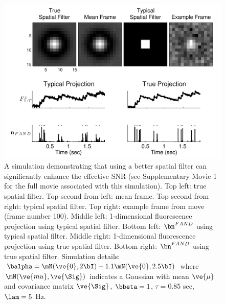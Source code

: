 \begin{figure}[H]
\centering \includegraphics[width=.9\linewidth]{../figs/spatial}
\caption{A simulation demonstrating that using a better spatial filter can significantly enhance the effective SNR (see Supplementary Movie 1 for the full movie associated with this simulation).  Top left: true spatial filter.  Top second from left: mean frame.  Top second from right: typical spatial filter.   Top right: example frame from move (frame number 100).  Middle left: 1-dimensional fluorescence projection using typical spatial filter.  Bottom left: $\bn^{FAND}$ using typical spatial filter.  Middle right: 1-dimensional fluorescence projection using true spatial filter.  Bottom right: $\bn^{FAND}$ using true spatial filter. Simulation details: $\balpha=\mN(\ve{0},2 \bI)-1.1 \mN(\ve{0},2.5 \bI)$ where $\mN(\ve{mu},\ve{\Sig})$ indicates a Gaussian with mean $\ve{\mu}$ and covariance matrix $\ve{\Sig}$, $\bbeta=1$, $\tau=0.85$ sec, $\lam=5$ Hz.} \label{fig:spatial} \end{figure} 